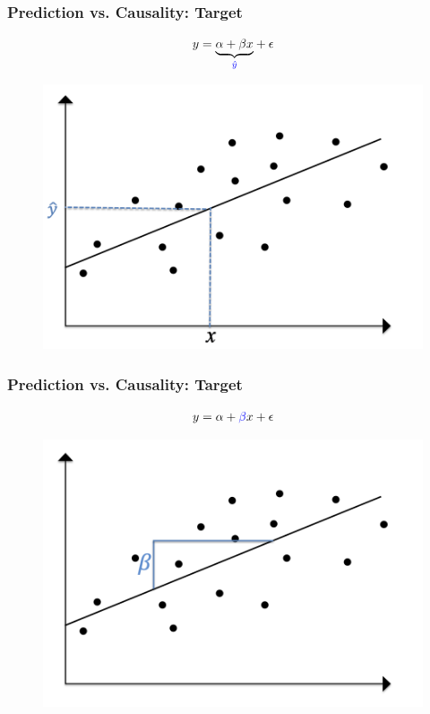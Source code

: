 \documentclass[
  shownotes,
  xcolor={svgnames},
  hyperref={colorlinks,citecolor=DarkBlue,linkcolor=andesred,urlcolor=DarkBlue}
  , aspectratio=169]{beamer}
\begin{document}
\begin{frame}
\frametitle{Prediction vs. Causality: Target}

\begin{align}
y= \underset{\textcolor{blue}{\hat{y}}}{\underbrace{\alpha+\beta x}}+\epsilon
\end{align}
  \begin{figure}[H] \centering
            \captionsetup{justification=centering}  
            \includegraphics[scale=0.4]{figures/target2.png}
            
    \end{figure}

\end{frame}
\begin{frame}
\frametitle{Prediction vs. Causality: Target}

\begin{align}
y= \alpha+\textcolor{blue}{\beta} x+\epsilon
\end{align}
  \begin{figure}[H] \centering
            \captionsetup{justification=centering}  
            \includegraphics[scale=0.4]{figures/target3.png}
            
    \end{figure}

\end{frame}
\end{document}
